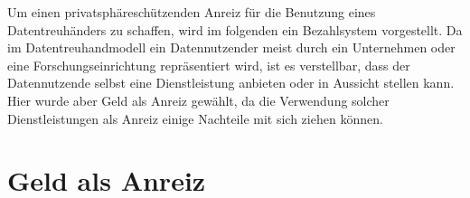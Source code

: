 \documentclass[11pt,a4paper]{scrreprt}
\begin{document}


Um einen privatsphäreschützenden Anreiz für die Benutzung eines Datentreuhänders zu schaffen, wird im folgenden ein Bezahlsystem vorgestellt. Da im Datentreuhandmodell ein Datennutzender meist durch ein Unternehmen oder eine Forschungseinrichtung repräsentiert wird, ist es verstellbar, dass der Datennutzende selbst eine Dienstleistung anbieten oder in Aussicht stellen kann. Hier wurde aber Geld als Anreiz gewählt, da die Verwendung solcher Dienstleistungen als Anreiz einige Nachteile mit sich ziehen können.

\section{Geld als Anreiz}
\end{document}
